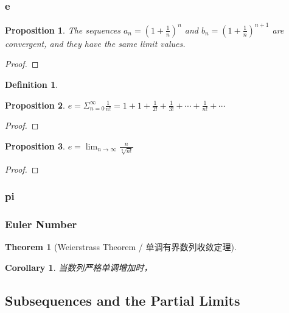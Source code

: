 \documentclass[onecolumn]{ctexart}
\newtheorem{definition}{Definition}
\newtheorem{theorem}{Theorem}
\newtheorem{proposition}{Proposition}
\newtheorem{corollary}{Corollary}
\begin{document}
\subsubsection{e}

\begin{proposition}
  The sequences $a_n = (1 + \frac{1}{n})^n$ and $b_n = (1 + \frac{1}{n})^{n+1}$ 
  are convergent, and they have the same limit values.
\end{proposition}
\begin{proof}
  
\end{proof}

\begin{definition}
  
\end{definition}

\begin{proposition}
  $e = \Sigma_{n=0}^{\infty} \frac{1}{n!} = 1 + 1 + \frac{1}{2!} + \frac{1}{3!} + \cdots + \frac{1}{n!} + \cdots$
\end{proposition}
\begin{proof}
  
\end{proof}

\begin{proposition}
  $e = \lim_{n \to \infty} \frac{n}{\sqrt[n]{n!}}$
\end{proposition}
\begin{proof}
  
\end{proof}

\subsubsection{pi}

\subsubsection{Euler Number}

\begin{theorem}[Weierstrass Theorem / 单调有界数列收敛定理]
  
\end{theorem}

\begin{corollary}
  当数列严格单调增加时，
\end{corollary}

\subsection{Subsequences and the Partial Limits}
\end{document}
